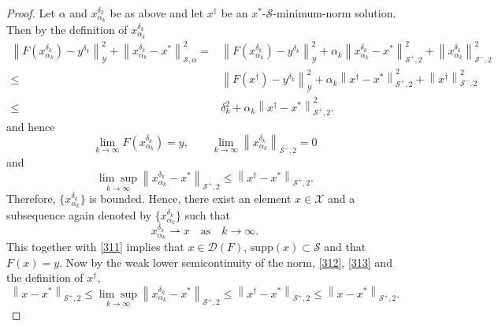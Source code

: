 \documentclass[11pt]{article}
\begin{document}
\begin{proof}
Let $ \alpha $ and $ x_{\alpha_k}^{\delta_k} $ be as above and let $ x^\dagger $ be an $ x^* $-$\mathcal{S}$-minimum-norm solution. 
Then by the definition of $ x_{\alpha_k}^{\delta_k} $
\begin{displaymath}
\begin{aligned}
\left\|F(x_{\alpha_k}^{\delta_k}) - y^{\delta_k}\right\|^2_\mathcal{Y} + \left\|x^{\delta_k}_{\alpha_k} - x^*\right\|_{\mathcal{S}, \alpha}^2
=
&\left\|F(x_{\alpha_k}^{\delta_k}) - y^{\delta_k}\right\|^2_\mathcal{Y} + \alpha_k\left\|x^{\delta_k}_{\alpha_k} - x^*\right\|_{\mathcal{S}^+, 2}^2 + \left\|x^{\delta_k}_{\alpha_k}\right\|_{\mathcal{S}^-, 2}^2\\
\leq 
&\left\|F(x^\dagger) - y^{\delta_k}\right\|^2_\mathcal{Y} + \alpha_k\left\|x^\dagger - x^*\right\|_{\mathcal{S}^+, 2}^2 + \left\|x^\dagger\right\|_{\mathcal{S}^-, 2}^2\\
\leq
&\delta_k^2 + \alpha_k\left\|x^\dagger - x^*\right\|_{\mathcal{S}^+, 2}^2.
\end{aligned}
\end{displaymath}
and hence
\begin{equation}\label{311}
\lim_{k\to \infty}F(x_{\alpha_k}^{\delta_k}) = y,\qquad \lim_{k\to \infty}\left\|x^{\delta_k}_{\alpha_k}\right\|_{\mathcal{S}^-, 2} = 0
\end{equation}
and
\begin{equation}\label{312}
\underset{k\to\infty}{\lim\sup}\left\|x_{\alpha_k}^{\delta_k} - x^*\right\|_{\mathcal{S}^+, 2} \leq \left\|x^\dagger - x^*\right\|_{\mathcal{S}^+, 2}.
\end{equation}
Therefore, $ \{x_{\alpha_k}^{\delta_k}\} $ is bounded. Hence, there exist an element $ x\in\mathcal{X} $ and a subsequence again denoted by $ \{x_{\alpha_k}^{\delta_k}\} $ such that
\begin{equation}\label{313}
x_{\alpha_k}^{\delta_k}\rightharpoonup x\quad \mathrm{as}\quad k\to \infty.
\end{equation}
This together with \eqref{311} implies that $ x\in\mathcal{D}(F) $, $ \mathrm{supp}(x)\subset\mathcal{S} $ and that $ F(x) = y $. Now by the weak lower semicontinuity of the norm, \eqref{312}, \eqref{313} and the definition of $ x^\dagger $,
\begin{equation*}
\left\|x - x^*\right\|_{\mathcal{S}^+, 2} \leq \underset{k\to\infty}{\lim\sup}\left\|x_{\alpha_k}^{\delta_k} - x^*\right\|_{\mathcal{S}^+, 2} \leq \left\|x^\dagger - x^*\right\|_{\mathcal{S}^+, 2} \leq \left\|x - x^*\right\|_{\mathcal{S}^+, 2}.

\end{equation*}
\end{proof}
\end{document}
